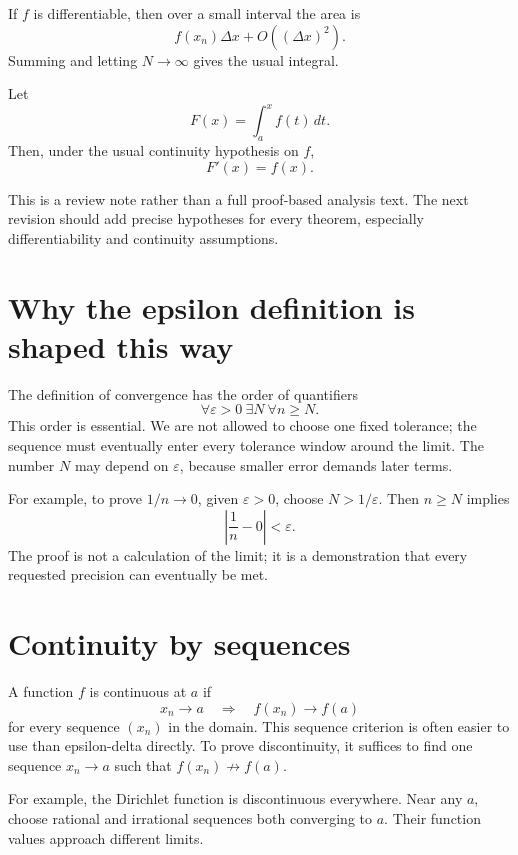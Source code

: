 If \(f\) is differentiable, then over a small interval the area is
\[
  f(x_n)\Delta x+O((\Delta x)^2).
\]
Summing and letting \(N\to\infty\) gives the usual integral.

\begin{theorem}
Let
\[
  F(x)=\int_a^x f(t)\,dt.
\]
Then, under the usual continuity hypothesis on \(f\),
\[
  F'(x)=f(x).
\]
\end{theorem}

\begin{remark}
This is a review note rather than a full proof-based analysis text.  The next revision should add precise hypotheses for every theorem, especially differentiability and continuity assumptions.
\end{remark}


\section{Why the epsilon definition is shaped this way}

The definition of convergence has the order of quantifiers
\[
  \forall\varepsilon>0\ \exists N\ \forall n\ge N.
\]
This order is essential.  We are not allowed to choose one fixed tolerance; the sequence must eventually enter every tolerance window around the limit.  The number \(N\) may depend on \(\varepsilon\), because smaller error demands later terms.

For example, to prove \(1/n\to0\), given \(\varepsilon>0\), choose \(N>1/\varepsilon\).  Then \(n\ge N\) implies
\[
  \left|\frac1n-0\right|<\varepsilon.
\]
The proof is not a calculation of the limit; it is a demonstration that every requested precision can eventually be met.

\section{Continuity by sequences}

A function \(f\) is continuous at \(a\) if
\[
  x_n\to a\quad\Longrightarrow\quad f(x_n)\to f(a)
\]
for every sequence \((x_n)\) in the domain.  This sequence criterion is often easier to use than epsilon-delta directly.  To prove discontinuity, it suffices to find one sequence \(x_n\to a\) such that \(f(x_n)\not\to f(a)\).

For example, the Dirichlet function is discontinuous everywhere.  Near any \(a\), choose rational and irrational sequences both converging to \(a\).  Their function values approach different limits.

